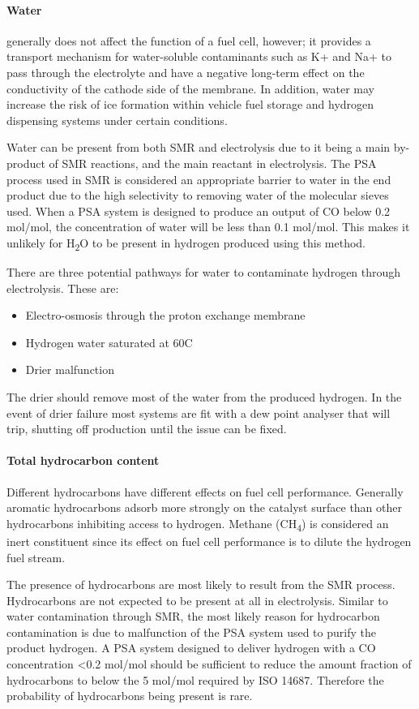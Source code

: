 \paragraph{Water}
generally does not affect the function of a fuel cell, however; it provides a transport mechanism for water-soluble contaminants such as K+ and Na+ to pass through the electrolyte and have a negative long-term effect on the conductivity of the cathode side of the membrane. In addition, water may increase the risk of ice formation within vehicle fuel storage and hydrogen dispensing systems under certain conditions. 

Water can be present from both SMR and electrolysis due to it being a main by-product of SMR reactions, and the main reactant in electrolysis. The PSA process used in SMR is considered an appropriate barrier to water in the end product due to the high selectivity to removing water of the molecular sieves used. When a PSA system is designed to produce an output of CO below 0.2 \textmu mol/mol, the concentration of water will be less than 0.1 \textmu mol/mol. This makes it unlikely for H\textsubscript{2}O to be present in hydrogen produced using this method.


There are three potential pathways for water to contaminate hydrogen through electrolysis. These are:
\begin{itemize}
    \item Electro-osmosis through the proton exchange membrane
    \item Hydrogen water saturated at 60\textdegree C
    \item Drier malfunction
\end{itemize}
The drier should remove most of the water from the produced hydrogen. In the event of drier failure most systems are fit with a dew point analyser that will trip, shutting off production until the issue can be fixed. 

\paragraph{Total hydrocarbon content}
Different hydrocarbons have different effects on fuel cell performance. Generally aromatic hydrocarbons adsorb more strongly on the catalyst surface than other hydrocarbons inhibiting access to hydrogen. Methane (CH\textsubscript{4}) is considered an inert constituent since its effect on fuel cell performance is to dilute the hydrogen fuel stream.

The presence of hydrocarbons are most likely to result from the SMR process. Hydrocarbons are not expected to be present at all in electrolysis. Similar to water contamination through SMR, the most likely reason for hydrocarbon contamination is due to malfunction of the PSA system used to purify the product hydrogen. A PSA system designed to deliver hydrogen with a CO concentration <0.2 \textmu mol/mol should be sufficient to reduce the amount fraction of hydrocarbons to below the 5 \textmu mol/mol required by ISO 14687. Therefore the probability of hydrocarbons being present is rare. 

